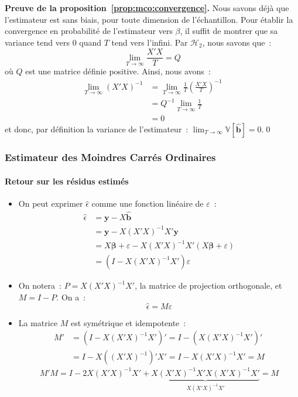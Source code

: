 \documentclass[10pt]{beamer}
\begin{document}
\begin{notes}

  \textbf{Preuve de la proposition~\ref{prop:mco:convergence}.} Nous savons déjà que l'estimateur est sans biais, pour toute dimension de l'échantillon. Pour établir la convergence en probabilité de l'estimateur vers $\beta$, il suffit de montrer que sa variance tend vers 0 quand $T$ tend vers l'infini. Par $\mathcal H_2$, nous savons que~:
\[
      \lim_{T\rightarrow\infty} \frac{X'X}{T} = Q
    \]
    où $Q$ est une matrice définie positive. Ainsi, nous avons~:
    \[
      \begin{split}
        \lim_{T\to\infty} (X'X)^{-1} &= \lim_{T\to\infty} \frac{1}{T}\left(\frac{X'X}{T}\right)^{-1}\\
                                     &= Q^{-1}\lim_{T\to\infty} \frac{1}{T}\\
                                     &= 0
      \end{split}
    \]
    et donc, par définition la variance de l'estimateur~: $\lim_{T\to\infty} \mathbb V[\hat{\mathbf b}] = 0$.\qed
\end{notes}


\begin{frame}
  \frametitle{Estimateur des Moindres Carrés Ordinaires}
  \framesubtitle {Retour sur les résidus estimés}

  \begin{itemize}

  \item On peut exprimer $\hat\epsilon$ comme une fonction linéaire de $\varepsilon$~:
    \[
      \begin{split}
        \hat\epsilon &= \mathbf y-X\hat{\mathbf b}\\
                     &= \mathbf y - X(X'X)^{-1}X'\mathbf y\\
                     &= X\mathbf\beta + \varepsilon - X(X'X)^{-1}X'\left( X\mathbf\beta + \varepsilon\right)\\
                     &= \left( I -  X(X'X)^{-1}X'\right)\varepsilon
      \end{split}
    \]

    \medskip

  \item On notera~: $P = X(X'X)^{-1}X'$, la matrice de projection orthogonale, et $M = I-P$. On a~:
    \[
      \hat\epsilon = M\varepsilon
    \]

    \medskip

  \item La matrice $M$ est symétrique et idempotente~:
    \[
      \begin{split}
        M' &= \left( I - X(X'X)^{-1}X' \right)' = I - \left( X(X'X)^{-1}X' \right)'\\
           &= I - X\left((X'X)^{-1}\right)'X' = I - X(X'X)^{-1}X' = M
      \end{split}
    \]
    \[
      M'M = I-2X(X'X)^{-1}X'+\underbrace{X(X'X)^{-1}X'X(X'X)^{-1}X'}_{X(X'X)^{-1}X'}= M
    \]
  \end{itemize}

\end{frame}
\end{document}

